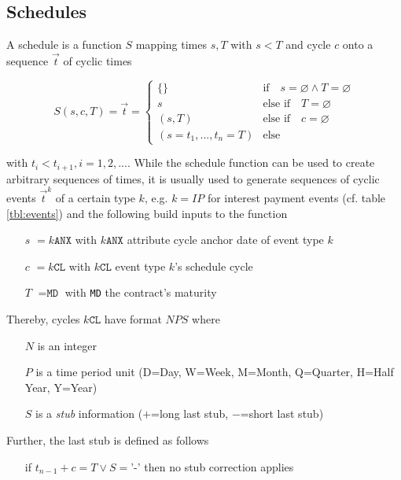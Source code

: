 \documentclass[9pt,oneside]{amsart}
\newcommand{\attr}[1]{\texttt{#1}}
\newcommand{\sdl}[3]{S(#1,#2,#3)}
\newcommand{\undef}{\varnothing}
\begin{document}
\begin{multicols}{2}
\subsection{Schedules}\label{sec:schedules}

A schedule is a function $S$ mapping times $s,T$ with $s<T$ and cycle $c$ onto a sequence $\vec{t}$ of cyclic times

\[
	\sdl{s}{c}{T}=\vec{t}=\begin{cases} \{\} & \text{if}\quad s=\undef\land T=\undef\\ 
					s & \text{else if}\quad T=\undef\\
					(s,T) & \text{else if}\quad c=\undef\\
					(s=t_1,...,t_n=T) & \text{else} \end{cases}
\]

with $t_i<t_{i+1}, i=1,2,...$. While the schedule function can be used to create arbitrary sequences of times, it is usually used to generate sequences of cyclic events $\vec{t}^k$ of a certain type $k$, e.g. $k=IP$ for interest payment events (cf. table \ref{tbl:events}) and the following build inputs to the function

\begin{itemize}
	\item[$s$] $=k\attr{ANX}$ with $k\attr{ANX}$ attribute cycle anchor date of event type $k$
	
	\item[$c$] $=k\attr{CL}$ with $k\attr{CL}$ event type $k$'s schedule cycle
	
	\item[$T$] $=\attr{MD}$ with \attr{MD} the contract's maturity
\end{itemize}

Thereby, cycles $k\attr{CL}$ have format $NPS$ where 

\begin{itemize}
	\item[$N$] is an integer
	\item[$P$] is a time period unit (D=Day, W=Week, M=Month, Q=Quarter, H=Half Year, Y=Year)
	\item[$S$] is a \textit{stub} information ($+$=long last stub, $-$=short last stub)
\end{itemize}

Further, the last stub is defined as follows

\begin{itemize}
	\item[if] $t_{n-1}+c=T \lor S=$'-' then no stub correction applies


\end{itemize}
\end{multicols}
\end{document}
